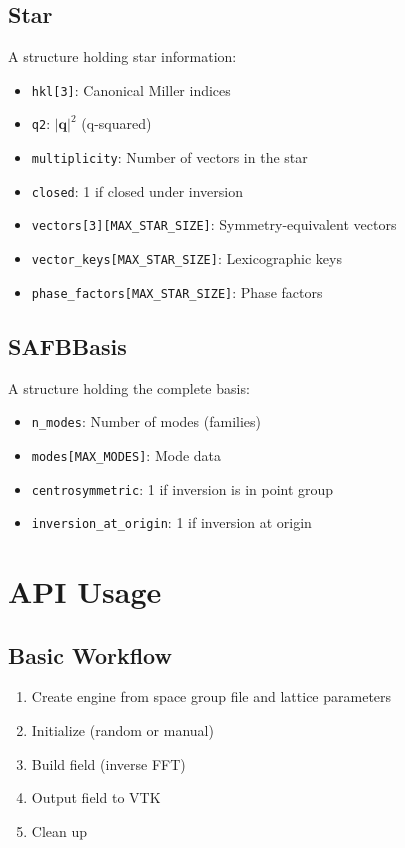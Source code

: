 \subsection{Star}

A structure holding star information:

\begin{itemize}
    \item \texttt{hkl[3]}: Canonical Miller indices
    \item \texttt{q2}: $|\boldsymbol{q}|^2$ (q-squared)
    \item \texttt{multiplicity}: Number of vectors in the star
    \item \texttt{closed}: 1 if closed under inversion
    \item \texttt{vectors[3][MAX\_STAR\_SIZE]}: Symmetry-equivalent vectors
    \item \texttt{vector\_keys[MAX\_STAR\_SIZE]}: Lexicographic keys
    \item \texttt{phase\_factors[MAX\_STAR\_SIZE]}: Phase factors
\end{itemize}

\subsection{SAFBBasis}

A structure holding the complete basis:

\begin{itemize}
    \item \texttt{n\_modes}: Number of modes (families)
    \item \texttt{modes[MAX\_MODES]}: Mode data
    \item \texttt{centrosymmetric}: 1 if inversion is in point group
    \item \texttt{inversion\_at\_origin}: 1 if inversion at origin
\end{itemize}

\section{API Usage}

\subsection{Basic Workflow}

\begin{enumerate}
    \item Create engine from space group file and lattice parameters
    \item Initialize (random or manual)
    \item Build field (inverse FFT)
    \item Output field to VTK
    \item Clean up
\end{enumerate}

